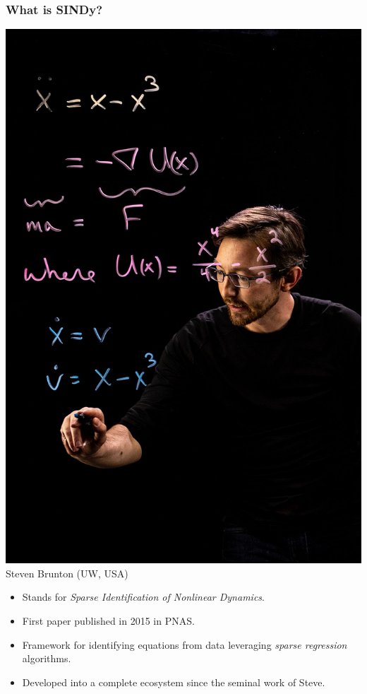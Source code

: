 \documentclass[aspectratio=169,compress,12pt]{beamer}
\begin{document}
\begin{frame}
    \frametitle{What is SINDy?}
    \begin{minipage}{.28\textwidth}
        \centering
        \includegraphics[width=\textwidth]{imgs/steve.jpg}
        \tiny
        Steven Brunton (UW, USA)
    \end{minipage}%
    \hfill
    \begin{minipage}{.68\textwidth}
        \vspace{-2em}
        \begin{itemize}
            \item Stands for \emph{Sparse Identification of Nonlinear Dynamics}.
            \item First paper published in 2015 in PNAS.
            \item Framework for identifying equations from data leveraging \emph{sparse regression} algorithms.
            \item Developed into a complete ecosystem since the seminal work of Steve.
        \end{itemize}
    \end{minipage}
    \vfill
\end{frame}
\end{document}
